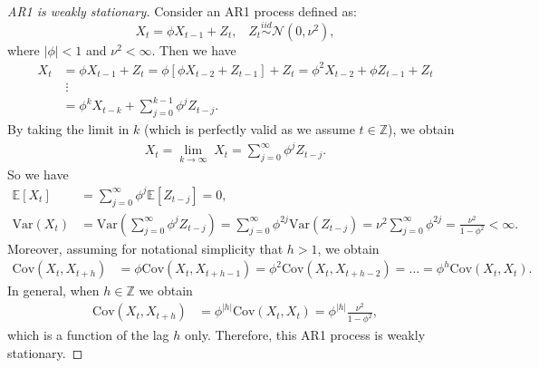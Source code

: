 \documentclass[]{book}
\theoremstyle{definition}
\theoremstyle{definition}
\theoremstyle{definition}
\theoremstyle{remark}
\let\BeginKnitrBlock\begin \let\EndKnitrBlock\end
\begin{document}
\BeginKnitrBlock{proof}[AR1 is weakly stationary]
{}Consider an AR1
process defined as: \begin{equation*}
X_t = \phi X_{t-1} + Z_t, \;\;\; Z_t \overset{iid}{\sim} \mathcal{N}(0,\nu^2),
\end{equation*} where \(\mid \phi \mid < 1\) and \(\nu^2 < \infty\).
Then we have \[\begin{aligned}
{X_t}  &=   {\phi }{X_{t - 1}} + {Z_t} = \phi \left[ {\phi {X_{t - 2}} + {Z_{t - 1}}} \right] + {Z_t} =  {\phi ^2}{X_{t - 2}} + \phi {Z_{t - 1}} + {Z_t}  \\
& \; \vdots  \\
&=   {\phi ^k}{X_{t-k}} + \sum\limits_{j = 0}^{k - 1} {{\phi ^j}{Z_{t - j}}} .
\end{aligned} \] By taking the limit in \(k\) (which is perfectly valid
as we assume \(t \in \mathbb{Z}\)), we obtain \begin{equation*}
\begin{aligned}
X_t = \mathop {\lim }\limits_{k \to \infty} \; {X_t}  =  \sum\limits_{j = 0}^{\infty} {{\phi ^j}{Z_{t - j}}}.
\end{aligned}
\end{equation*} So we have \begin{equation*}
\begin{aligned}
\mathbb{E}\left[X_t\right] &=  \sum\limits_{j = 0}^{\infty} {{\phi ^j}{\mathbb{E} [Z_{t - j}]}} = 0, \\
\text{Var}\left(X_t\right) &= \text{Var}\left(\sum\limits_{j = 0}^{\infty} {{\phi ^j}{Z_{t - j}}}\right) = \sum\limits_{j = 0}^{\infty} {\phi^{2j}} \text{Var}\left(Z_{t-j}\right) = \nu^2 \sum\limits_{j = 0}^{\infty} {\phi^{2j}} = \frac{\nu^2}{1-\phi^2} < \infty.
\end{aligned}
\end{equation*} Moreover, assuming for notational simplicity that
\(h > 1\), we obtain \begin{equation*}
\begin{aligned}
\text{Cov}\left(X_t, X_{t+h}\right) &= \phi \text{Cov}\left(X_t, X_{t+h-1}\right) = \phi^2 \text{Cov}\left(X_t, X_{t+h-2}\right) = \ldots = \phi^h \text{Cov}(X_t, X_t).
\end{aligned}
\end{equation*} In general, when \(h \in \mathbb{Z}\) we obtain
\begin{equation*}
\begin{aligned}
\text{Cov}\left(X_t, X_{t+h}\right) & = \phi^{|h|} \text{Cov}(X_t, X_t) = \phi^{|h|} \frac{\nu^2}{1-\phi^2},
\end{aligned}
\end{equation*} which is a function of the lag \(h\) only. Therefore,
this AR1 process is weakly stationary.
\EndKnitrBlock{proof}
\end{document}
